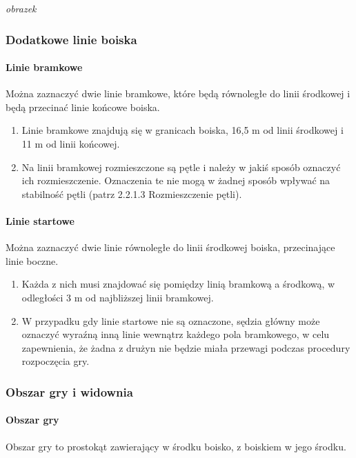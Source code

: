 \documentclass[12pt]{article}
\begin{document}
\textit{obrazek}

\subsubsection{Dodatkowe linie boiska}

\paragraph{Linie bramkowe}
Można zaznaczyć dwie linie
bramkowe, które będą równoległe do linii środkowej i będą przecinać
linie końcowe boiska.

\begin{enumerate}
	\item Linie bramkowe znajdują się w granicach boiska, 16,5 m od linii
	      środkowej i 11 m od linii końcowej.

	\item Na linii bramkowej rozmieszczone są pętle i należy w jakiś sposób
	      oznaczyć ich rozmieszczenie. Oznaczenia te nie mogą w żadnej sposób
	      wpływać na stabilność pętli (patrz 2.2.1.3 Rozmieszczenie pętli).
\end{enumerate}

\paragraph{Linie startowe}
Można zaznaczyć dwie linie równoległe
do linii środkowej boiska, przecinające linie boczne.

\begin{enumerate}
	\item Każda z nich musi znajdować się pomiędzy linią bramkową a środkową, w
	      odległości 3 m od najbliższej linii bramkowej.
	\item W przypadku gdy linie startowe nie są oznaczone, sędzia główny może
	      oznaczyć wyraźną inną linie wewnątrz każdego pola bramkowego, w celu
	      zapewnienia, że żadna z drużyn nie będzie miała przewagi podczas
	      procedury rozpoczęcia gry.
\end{enumerate}

\subsubsection{Obszar gry i widownia}

\paragraph{Obszar gry}
Obszar gry to prostokąt zawierający w
środku boisko, z boiskiem w jego środku.
\end{document}
